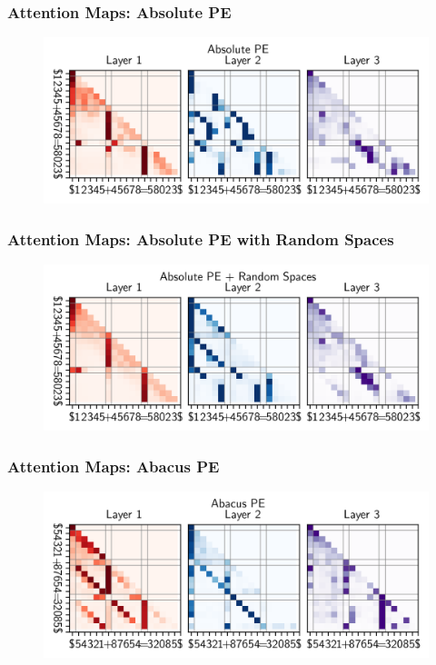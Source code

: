 \documentclass[14pt,aspectratio=169]{beamer}
\theoremstyle{remark}
\begin{document}
\begin{frame}
    \frametitle{Attention Maps: Absolute PE}
    \begin{figure}
        \centering
        \includegraphics[width=0.9\linewidth]{fig/attn_map_abs_pe.png}
    \end{figure}
\end{frame}

\begin{frame}
    \frametitle{Attention Maps: Absolute PE with Random Spaces}
    \begin{figure}
        \centering
        \includegraphics[width=0.9\linewidth]{fig/attn_map_abs_pe_random_spaces.png}
    \end{figure}
\end{frame}

\begin{frame}
    \frametitle{Attention Maps: Abacus PE}
    \begin{figure}
        \centering
        \includegraphics[width=0.9\linewidth]{fig/attn_map_abacus_pe.png}
    \end{figure}
\end{frame}
\end{document}
